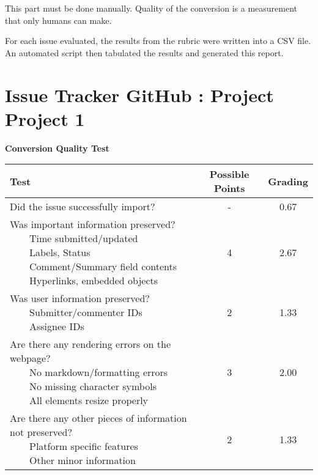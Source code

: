 \documentclass{article}
\newcommand{\tabitem}{~~\llap{\textbullet}~~}
\begin{document}
	This part must be done manually. Quality of the conversion is a measurement that only humans can make.
	
	For each issue evaluated, the results from the rubric were written into a CSV file. 
	An automated script then tabulated the results and generated this report.
	
\pagebreak\section{Issue Tracker GitHub : Project Project 1}
\textbf{Conversion Quality Test}\\
\begin{adjustbox}{center}
	\renewcommand{\arraystretch}{1.5}
	\begin{tabular}{ p{6cm} | c | c }
		Test & Possible Points & Grading \\ \hline
		Did the issue successfully import? & - & 0.67 \\
		\hline
		\makecell[l]{
			Was important information preserved? \\
			\tabitem Time submitted/updated \\
			\tabitem Labels, Status \\
			\tabitem Comment/Summary field contents \\
			\tabitem Hyperlinks, embedded objects}
		& 4 & 2.67 \\
		\hline
		\makecell[l]{
			Was user information preserved? \\
			\tabitem Submitter/commenter IDs \\
			\tabitem Assignee IDs
		} & 2 & 1.33 \\
		\hline
		\makecell[{{p{6cm}}}]{
			Are there any rendering errors on the webpage? \\
			\tabitem No markdown/formatting errors \\
			\tabitem No missing character symbols \\
			\tabitem All elements resize properly
		} & 3 & 2.00 \\
		\hline
		\makecell[{{p{6cm}}}]{
			Are there any other pieces of information not preserved? \\
			\tabitem Platform specific features \\
			\tabitem Other minor information
		} & 2 & 1.33 \\
	\end{tabular}
\end{adjustbox}
\\
\end{document}
